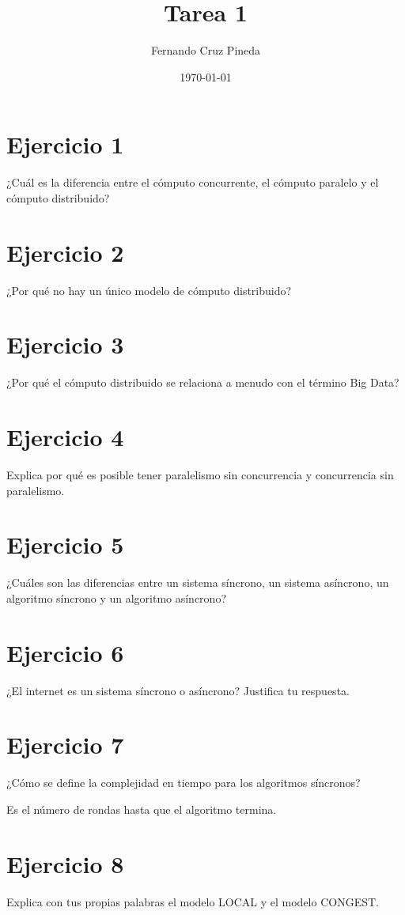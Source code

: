 \documentclass{article}
\title{Tarea 1}
\author{Fernando Cruz Pineda
  \\  
}
\date{\today}
\begin{document}
\maketitle
\section*{Ejercicio 1}
¿Cuál es la diferencia entre el cómputo concurrente, el cómputo paralelo y el cómputo distribuido?

\section*{Ejercicio 2}
¿Por qué no hay un único modelo de cómputo distribuido?

\section*{Ejercicio 3}
¿Por qué el cómputo distribuido se relaciona a menudo con el término Big Data?

\section*{Ejercicio 4}
Explica por qué es posible tener paralelismo sin concurrencia y concurrencia sin paralelismo.

\section*{Ejercicio 5}
¿Cuáles son las diferencias entre un sistema síncrono, un sistema asíncrono, un algoritmo síncrono y un algoritmo asíncrono?

\section*{Ejercicio 6}
¿El internet es un sistema síncrono o asíncrono? Justifica tu respuesta.

\section*{Ejercicio 7}
¿Cómo se define la complejidad en tiempo para los algoritmos síncronos?

Es el número de rondas hasta que el algoritmo termina.
\section*{Ejercicio 8}
Explica con tus propias palabras el modelo LOCAL y el modelo CONGEST.
\end{document}
